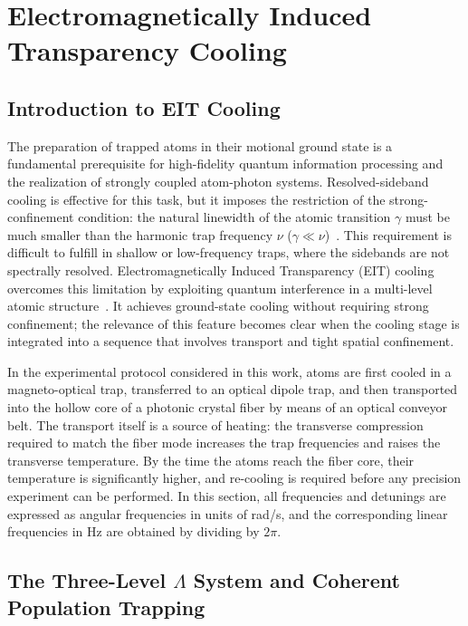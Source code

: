 \section{Electromagnetically Induced Transparency Cooling}
\label{sec:EIT_cooling}

\subsection{Introduction to EIT Cooling}

The preparation of trapped atoms in their motional ground state is a fundamental prerequisite for high-fidelity quantum information processing and the realization of strongly coupled atom-photon systems.
Resolved-sideband cooling is effective for this task, but it imposes the restriction of the strong-confinement condition: the natural linewidth of the atomic transition $\gamma$ must be much smaller than the harmonic trap frequency $\nu$ ($\gamma \ll \nu$)~\cite{Morigi:00}. This requirement is difficult to fulfill in shallow or low-frequency traps, where the sidebands are not spectrally resolved.
Electromagnetically Induced Transparency (EIT) cooling overcomes this
limitation by exploiting quantum interference in a multi-level atomic
structure~\cite{Morigi:00, Morigi:03}. It achieves ground-state cooling
without requiring strong confinement; the relevance of this feature becomes
clear when the cooling stage is integrated into a sequence that
involves transport and tight spatial confinement.

In the experimental protocol considered in this work, atoms are first
cooled in a magneto-optical trap, transferred to an optical dipole trap,
and then transported into the hollow core of a photonic crystal fiber by
means of an optical conveyor belt. The transport itself is a source of
heating: the transverse compression required to match the fiber mode increases the trap frequencies and raises the transverse temperature.
By the time the atoms reach the fiber core, their temperature is significantly higher, and re-cooling is required
before any precision experiment can be performed. 
In this section, all frequencies and detunings are expressed as angular frequencies in units of rad/s, and the corresponding linear frequencies in Hz are obtained by dividing by $2\pi$.

\subsection[The Three-Level $\Lambda$ System and Coherent Population Trapping]{The Three-Level $\Lambda$ System and Coherent \\ Population Trapping}

